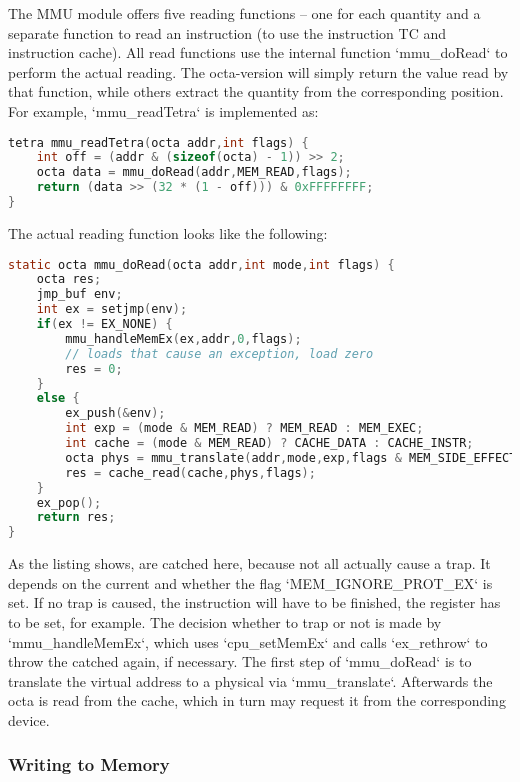 The MMU module offers five reading functions -- one for each quantity and a separate function to read an instruction (to use the instruction TC and instruction cache). All read functions use the internal function `mmu_doRead` to perform the actual reading. The octa-version will simply return the value read by that function, while others extract the quantity from the corresponding position. For example, `mmu_readTetra` is implemented as:
\begin{lstlisting}[language=C,caption={Implementation of {\tt mmu\_readTetra}}]
tetra mmu_readTetra(octa addr,int flags) {
	int off = (addr & (sizeof(octa) - 1)) >> 2;
	octa data = mmu_doRead(addr,MEM_READ,flags);
	return (data >> (32 * (1 - off))) & 0xFFFFFFFF;
}
\end{lstlisting}
The actual reading function looks like the following:
\begin{lstlisting}[language=C,caption={Implementation of {\tt mmu\_doRead}}]
static octa mmu_doRead(octa addr,int mode,int flags) {
	octa res;
	jmp_buf env;
	int ex = setjmp(env);
	if(ex != EX_NONE) {
		mmu_handleMemEx(ex,addr,0,flags);
		// loads that cause an exception, load zero
		res = 0;
	}
	else {
		ex_push(&env);
		int exp = (mode & MEM_READ) ? MEM_READ : MEM_EXEC;
		int cache = (mode & MEM_READ) ? CACHE_DATA : CACHE_INSTR;
		octa phys = mmu_translate(addr,mode,exp,flags & MEM_SIDE_EFFECTS);
		res = cache_read(cache,phys,flags);
	}
	ex_pop();
	return res;
}
\end{lstlisting}
As the listing shows,  are catched here, because not all  actually cause a trap. It depends on the current  and whether the flag `MEM_IGNORE_PROT_EX` is set. If no trap is caused, the instruction will have to be finished, \ie the register has to be set, for example. The decision whether to trap or not is made by `mmu_handleMemEx`, which uses `cpu_setMemEx` and calls `ex_rethrow` to throw the catched  again, if necessary. The first step of `mmu_doRead` is to translate the virtual address to a physical via `mmu_translate`. Afterwards the octa is read from the cache, which in turn may request it from the corresponding device.

\subsubsection{Writing to Memory}

